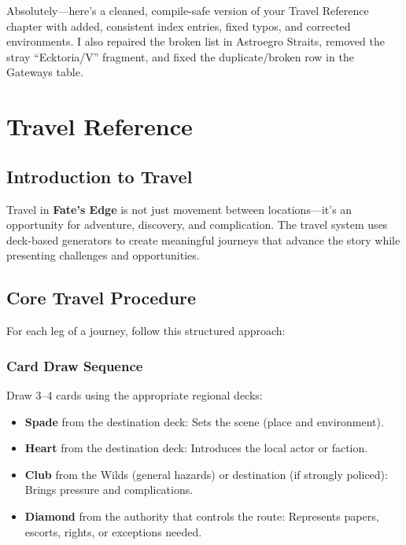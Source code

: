 Absolutely—here’s a cleaned, compile-safe version of your Travel Reference chapter with added, consistent index entries, fixed typos, and corrected environments. I also repaired the broken list in Astroegro Straits, removed the stray “Ecktoria/V” fragment, and fixed the duplicate/broken row in the Gateways table.

\chapter{Travel Reference}
\label{chap:travel-reference}

\section{Introduction to Travel}
\label{sec:travel-intro}

Travel in \textbf{Fate's Edge} is not just movement between locations—it's an opportunity for adventure, discovery, and complication. The travel system uses deck-based generators to create meaningful journeys that advance the story while presenting challenges and opportunities. 

\section{Core Travel Procedure}
\label{sec:core-travel}

For each leg of a journey, follow this structured approach: 

\subsection{Card Draw Sequence}
\label{subsec:card-draw}

Draw 3–4 cards using the appropriate regional decks:
\begin{itemize}
\item \textbf{Spade} from the destination deck: Sets the scene (place and environment).
\item \textbf{Heart} from the destination deck: Introduces the local actor or faction.
\item \textbf{Club} from the Wilds (general hazards) or destination (if strongly policed): Brings pressure and complications.
\item \textbf{Diamond} from the authority that controls the route: Represents papers, escorts, rights, or exceptions needed.
\end{itemize}

